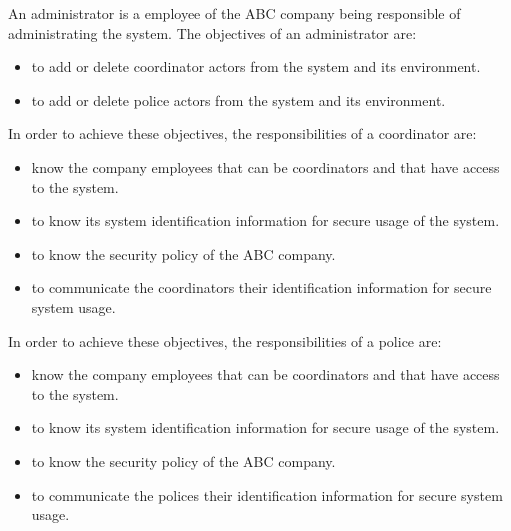 An administrator is a employee of the ABC company being responsible of administrating the \msricrash system. The objectives of an administrator are:
\begin{itemize}
  \item to add or delete coordinator actors from the system and its environment.
  \item to add or delete police actors from the system and its environment.
\end{itemize}
\vspace{0.5cm}

In order to achieve these objectives, the responsibilities of a coordinator are:
\begin{itemize}
  \item know the company employees that can be coordinators and that have access to the system.
  \item to know its system identification information for secure usage of the system.
  \item to know the security policy of the ABC company.
  \item to communicate the coordinators their identification information for secure system usage.
\end{itemize}

In order to achieve these objectives, the responsibilities of a police are:
\begin{itemize}
  \item know the company employees that can be coordinators and that have access to the system.
  \item to know its system identification information for secure usage of the system.
  \item to know the security policy of the ABC company.
  \item to communicate the polices their identification information for secure
  system usage.
\end{itemize}